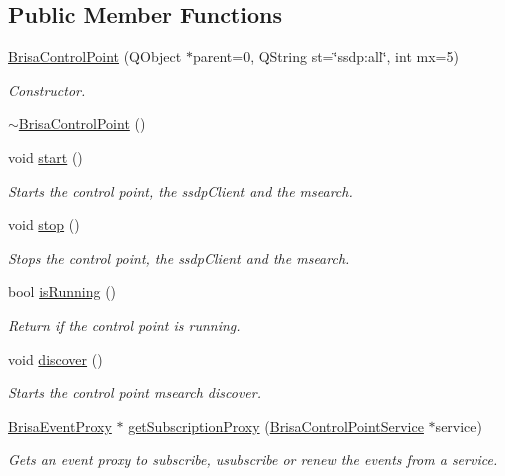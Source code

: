 \subsection*{Public Member Functions}
\begin{DoxyCompactItemize}
\item 
\hyperlink{classBrisaUpnp_1_1BrisaControlPoint_a59c74d17b9fa93839e027bcc3affb54e}{BrisaControlPoint} (QObject $\ast$parent=0, QString st=\char`\"{}ssdp:all\char`\"{}, int mx=5)
\begin{DoxyCompactList}\small\item\em Constructor. \item\end{DoxyCompactList}\item 
\hyperlink{classBrisaUpnp_1_1BrisaControlPoint_a5614755c2d4c0b3dc00c97e601d10e1a}{$\sim$BrisaControlPoint} ()
\item 
void \hyperlink{classBrisaUpnp_1_1BrisaControlPoint_ab370001909d0f7b0ec059b693675d964}{start} ()
\begin{DoxyCompactList}\small\item\em Starts the control point, the ssdpClient and the msearch. \item\end{DoxyCompactList}\item 
void \hyperlink{classBrisaUpnp_1_1BrisaControlPoint_a39876b0ff6901907710cd6f7782c4f52}{stop} ()
\begin{DoxyCompactList}\small\item\em Stops the control point, the ssdpClient and the msearch. \item\end{DoxyCompactList}\item 
bool \hyperlink{classBrisaUpnp_1_1BrisaControlPoint_ac42e2c437a1ced595f407d7ce386cf81}{isRunning} ()
\begin{DoxyCompactList}\small\item\em Return if the control point is running. \item\end{DoxyCompactList}\item 
void \hyperlink{classBrisaUpnp_1_1BrisaControlPoint_a369ace207c8aeb4256e10248c0c31c35}{discover} ()
\begin{DoxyCompactList}\small\item\em Starts the control point msearch discover. \item\end{DoxyCompactList}\item 
\hyperlink{classBrisaUpnp_1_1BrisaEventProxy}{BrisaEventProxy} $\ast$ \hyperlink{classBrisaUpnp_1_1BrisaControlPoint_aa1e4c21f1bc2e492c3e4dc88c06b4f32}{getSubscriptionProxy} (\hyperlink{classBrisaUpnp_1_1BrisaControlPointService}{BrisaControlPointService} $\ast$service)
\begin{DoxyCompactList}\small\item\em Gets an event proxy to subscribe, usubscribe or renew the events from a {\itshape service\/}. \item\end{DoxyCompactList}\end{DoxyCompactItemize}


